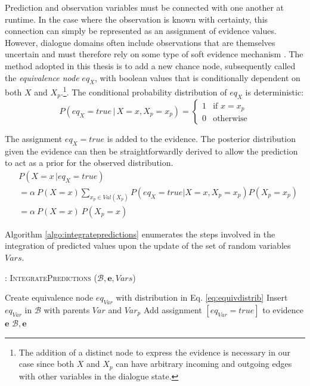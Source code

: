 Prediction and observation variables must be connected with one another at runtime.  In the case where the observation is known with certainty, this connection can simply be represented as an assignment of evidence values.  However, dialogue domains often include observations that are themselves uncertain and must therefore rely on some type of soft evidence mechanism \citep{Pan06beliefupdate}.  The method adopted in this thesis is to add a new chance node, subsequently called the \textit{equivalence node} $eq_{X}$, with boolean values that is conditionally dependent on both $X$ and $X_p$.\footnote{The addition of a distinct node to express the evidence is necessary in our case since both $X$ and $X_p$ can have arbitrary incoming and outgoing edges with other variables in the dialogue state.}.  The conditional probability distribution of $eq_X$ is deterministic:
\begin{equation}
P(eq_{X}\!=\!true \, | \, X\!=\!x, X_p\!=\!x_p) = \begin{cases}
1 & \text{if } x = x_p \\
0 & \text{otherwise}
\end{cases} \label{eq:equivdistrib}
\end{equation}

The assignment $eq_{X} \!=\! true$ is added to the evidence. The posterior distribution given the evidence can then be straightforwardly derived to allow the prediction to act as a prior for the observed distribution.
\begin{align}
&P(X = x \, | eq_{X}\!=\!true) \nonumber \\
&=  \alpha \ P(X\!=\!x)  \sum_{x_p \in Val(X_p)} P(eq_{X}\!=\!true | X\!=\!x, X_p \!=\!x_p ) P(X_p\!=\!x_p) \\
&= \alpha \ P(X\!=\!x) \ P(X_p\!=\!x) \label{eq:equivalence}
\end{align}

Algorithm \ref{algo:integratepredictions} enumerates the steps involved in the integration of predicted values upon the update of the set of random variables $Vars$. 

\begin{algorithm}[h]
\caption{: \textsc{IntegratePredictions} ($\mathcal{B}, \mathbf{e}, Vars$)}
\begin{algorithmic}[1] \vspace{1mm}
\STATE Create equivalence node $eq_{Var}$ with distribution in Eq. \eqref{eq:equivdistrib}
\STATE Insert $eq_{Var}$ in $\mathcal{B}$ with parents $\mathit{Var}$ and $\mathit{Var}_p$
\STATE Add assignment $[eq_{Var}\!=\!true]$ to evidence $\mathbf{e}$
\ENDIF
\ENDFOR
\RETURN $\mathcal{B}, \mathbf{e}$
\end{algorithmic}
\label{algo:integratepredictions}
\end{algorithm}


